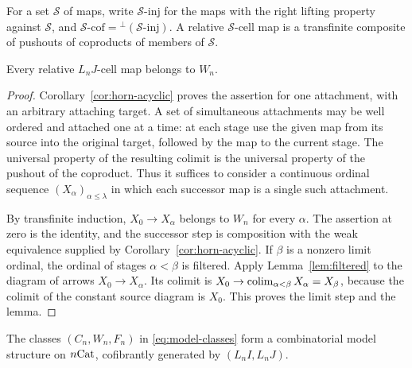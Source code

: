 For a set $\mathcal S$ of maps, write $\mathcal S\text{-inj}$ for the
maps with the right lifting property against $\mathcal S$, and
$\mathcal S\text{-cof}={}^{\perp}(\mathcal S\text{-inj})$.
A relative $\mathcal S$-cell map is a transfinite composite of
pushouts of coproducts of members of $\mathcal S$.

\begin{lemma}\label{lem:transfinite-horns}
Every relative $L_nJ$-cell map belongs to $W_n$.
\end{lemma}

\begin{proof}
Corollary~\ref{cor:horn-acyclic} proves the assertion for one
attachment, with an arbitrary attaching target.  A set of simultaneous
attachments may be well ordered and attached one at a time: at each
stage use the given map from its source into the original target,
followed by the map to the current stage.  The universal property of
the resulting colimit is the universal property of the pushout of
the coproduct.  Thus it suffices to consider a continuous ordinal
sequence $(X_\alpha)_{\alpha\leq\lambda}$ in which each successor
map is a single such attachment.

By transfinite induction, $X_0\to X_\alpha$ belongs to $W_n$ for
every $\alpha$.  The assertion at zero is the identity, and the
successor step is composition with the weak equivalence supplied by
Corollary~\ref{cor:horn-acyclic}.  If $\beta$ is a nonzero limit
ordinal, the ordinal of stages $\alpha<\beta$ is filtered.  Apply
Lemma~\ref{lem:filtered} to the diagram of arrows
$X_0\to X_\alpha$.  Its colimit is
$X_0\to\operatorname*{colim}_{\alpha<\beta}X_\alpha=X_\beta$, because the
colimit of the constant source diagram is $X_0$.  This proves the
limit step and the lemma.
\end{proof}

\begin{proposition}\label{prop:model-structure}
The classes $(C_n,W_n,F_n)$ in
\eqref{eq:model-classes} form a combinatorial model structure on
$n\mathrm{Cat}$, cofibrantly generated by $(L_nI,L_nJ)$.
\end{proposition}

